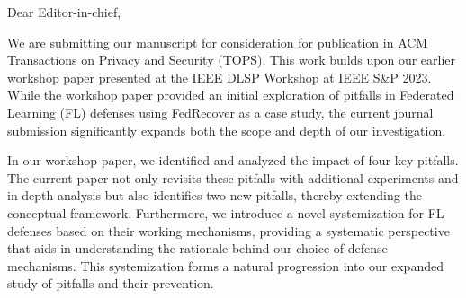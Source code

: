 


Dear Editor-in-chief,

We are submitting our manuscript for consideration for publication in ACM Transactions on Privacy and Security (TOPS). This work builds upon our earlier workshop paper presented at the IEEE DLSP Workshop at IEEE S\&P 2023. While the workshop paper provided an initial exploration of pitfalls in Federated Learning (FL) defenses using FedRecover as a case study, the current journal submission significantly expands both the scope and depth of our investigation.

In our workshop paper, we identified and analyzed the impact of four key pitfalls. The current paper not only revisits these pitfalls with additional experiments and in-depth analysis but also identifies two new pitfalls, thereby extending the conceptual framework. Furthermore, we introduce a novel systemization for FL defenses based on their working mechanisms, providing a systematic perspective that aids in understanding the rationale behind our choice of defense mechanisms. This systemization forms a natural progression into our expanded study of pitfalls and their prevention.

